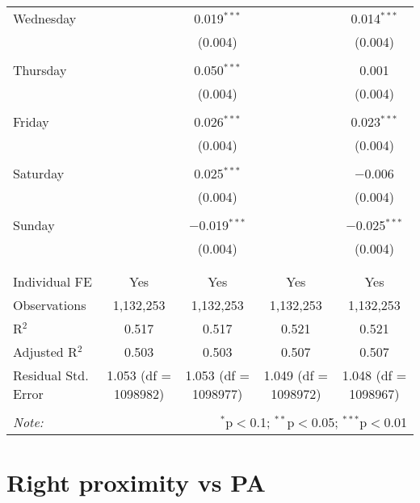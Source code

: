 \documentclass[
]{article}
\begin{document}
\begin{table}[!htbp]
{\begin{tabular}{@{\extracolsep{5pt}}lcccc}
 Wednesday &  & 0.019$^{***}$ &  & 0.014$^{***}$ \\ 
  &  & (0.004) &  & (0.004) \\ 
  & & & & \\ 
 Thursday &  & 0.050$^{***}$ &  & 0.001 \\ 
  &  & (0.004) &  & (0.004) \\ 
  & & & & \\ 
 Friday &  & 0.026$^{***}$ &  & 0.023$^{***}$ \\ 
  &  & (0.004) &  & (0.004) \\ 
  & & & & \\ 
 Saturday &  & 0.025$^{***}$ &  & $-$0.006 \\ 
  &  & (0.004) &  & (0.004) \\ 
  & & & & \\ 
 Sunday &  & $-$0.019$^{***}$ &  & $-$0.025$^{***}$ \\ 
  &  & (0.004) &  & (0.004) \\ 
  & & & & \\ 
\hline \\[-1.8ex] 
Individual FE & Yes & Yes & Yes & Yes \\ 
Observations & 1,132,253 & 1,132,253 & 1,132,253 & 1,132,253 \\ 
R$^{2}$ & 0.517 & 0.517 & 0.521 & 0.521 \\ 
Adjusted R$^{2}$ & 0.503 & 0.503 & 0.507 & 0.507 \\ 
Residual Std. Error & 1.053 (df = 1098982) & 1.053 (df = 1098977) & 1.049 (df = 1098972) & 1.048 (df = 1098967) \\ 
\hline 
\hline \\[-1.8ex] 
\textit{Note:}  & \multicolumn{4}{r}{$^{*}$p$<$0.1; $^{**}$p$<$0.05; $^{***}$p$<$0.01} \\ 
\end{tabular}
} 
\end{table} 
\newpage
\section{Right proximity vs PA}
\end{document}
